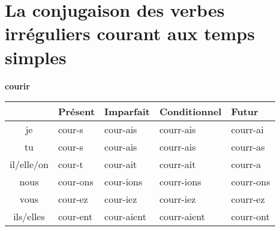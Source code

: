 \clearpage
\section{La conjugaison des verbes irr\'eguliers courant aux temps simples}
\setcounter{theorem}{0}
\setcounter{equation}{0}

\renewcommand{\stemPresent}{cour}
\renewcommand{\stemFutur}{courr}
\begin{center}
\textbf{courir}
\vskip 0.1cm
\begin{tabular}{|c||L{3cm}|L{3cm}|L{3cm}|L{3cm}|}
\hline
& Pr\'esent & Imparfait & Conditionnel & Futur \\
\hline\hline
je           &	\stemPresent-s 	&	\stemPresent-ais	&	\stemFutur-ais	 &	\stemFutur-ai	\\
tu           &	\stemPresent-s	&	\stemPresent-ais	&	\stemFutur-ais	&	\stemFutur-as	\\
il/elle/on &	\stemPresent-t	&	\stemPresent-ait	&	\stemFutur-ait	&	\stemFutur-a	\\
nous      &	\stemPresent-ons	&	\stemPresent-ions	&	\stemFutur-ions	&	\stemFutur-ons	\\
vous      &	\stemPresent-ez	&	\stemPresent-iez	&	\stemFutur-iez		&	\stemFutur-ez	\\
ils/elles  &	\stemPresent-ent	&	\stemPresent-aient	&	\stemFutur-aient	&	\stemFutur-ont	\\
\hline
\end{tabular}
\end{center}







